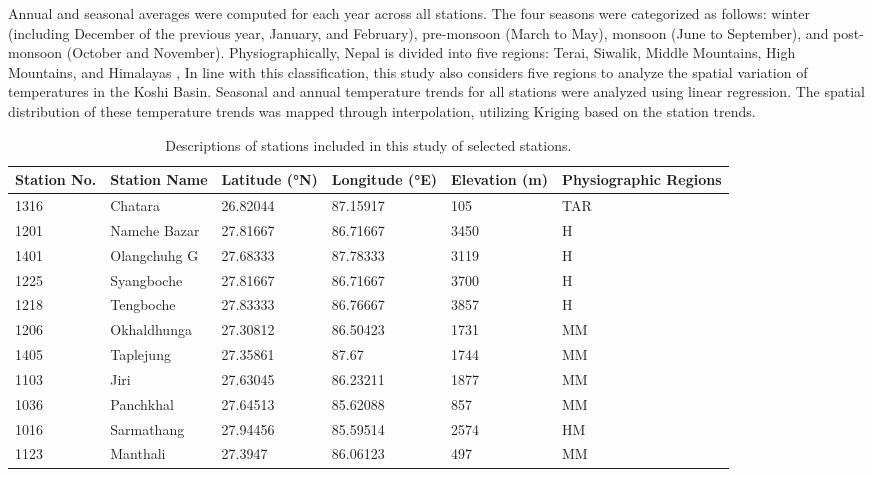   Annual and seasonal averages were computed for each year across all stations. The four seasons were categorized as follows: winter (including December of the previous year, January, and February), pre-monsoon (March to May), monsoon (June to September), and post-monsoon (October and November). Physiographically, Nepal is divided into five regions: Terai, Siwalik, Middle Mountains, High Mountains, and Himalayas \citep{nayava_spatial_2017}, In line with this classification, this study also considers five regions to analyze the spatial variation of temperatures in the Koshi Basin. Seasonal and annual temperature trends for all stations were analyzed using linear regression. The spatial distribution of these temperature trends was mapped through interpolation, utilizing Kriging based on the station trends.

\begin{table}[H]
  \centering
  \caption{Descriptions of stations included in this study of selected stations.}
  \label{tab:station_descriptions}
  \begin{tabularx}{\textwidth}{|X|X|X|X|X|X|}
      \toprule %
      \textbf{Station No.} & \textbf{Station Name} & \textbf{Latitude (°N)} & \textbf{Longitude (°E)} & \textbf{Elevation (m)} & \textbf{Physiographic Regions} \\
      \midrule %
      1316 & Chatara           & 26.82044 & 87.15917 & 105  & TAR \\
      1201 & Namche Bazar      & 27.81667 & 86.71667 & 3450 & H \\
      1401 & Olangchuhg G      & 27.68333 & 87.78333 & 3119 & H \\
      1225 & Syangboche        & 27.81667 & 86.71667 & 3700 & H \\
      1218 & Tengboche         & 27.83333 & 86.76667 & 3857 & H \\
      1206 & Okhaldhunga       & 27.30812 & 86.50423 & 1731 & MM \\
      1405 & Taplejung         & 27.35861 & 87.67    & 1744 & MM \\
      1103 & Jiri              & 27.63045 & 86.23211 & 1877 & MM \\
      1036 & Panchkhal         & 27.64513 & 85.62088 & 857  & MM \\
      1016 & Sarmathang        & 27.94456 & 85.59514 & 2574 & HM \\
      1123 & Manthali          & 27.3947  & 86.06123 & 497  & MM \\

\end{tabularx}
\end{table}
